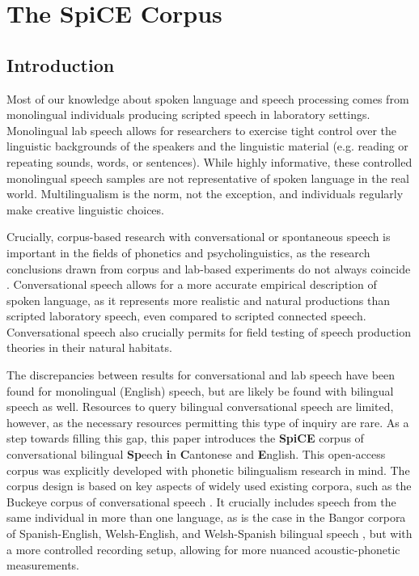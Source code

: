 
\chapter{The SpiCE Corpus}
\label{ch:Corpus}

\section{Introduction}\label{ch2:sec:introduction}
Most of our knowledge about spoken language and speech processing comes from monolingual individuals producing scripted speech in laboratory settings. Monolingual lab speech allows for researchers to exercise tight control over the linguistic backgrounds of the speakers and the linguistic material (e.g. reading or repeating sounds, words, or sentences). While highly informative, these controlled monolingual speech samples are not representative of spoken language in the real world. Multilingualism is the norm, not the exception, and individuals regularly make creative linguistic choices. 

Crucially, corpus-based research with conversational or spontaneous speech is important in the fields of phonetics and psycholinguistics, as the research conclusions drawn from corpus and lab-based experiments do not always coincide \citep{gahl_2012_reduce}. Conversational speech allows for a more accurate empirical description of spoken language, as it represents more realistic and natural productions than scripted laboratory speech, even compared to scripted connected speech. Conversational speech also crucially permits for field testing of speech production theories \citep{bell_2009_predictability, gahl_2012_reduce} in their natural habitats. 

The discrepancies between results for conversational and lab speech have been found for monolingual (English) speech, but are likely be found with bilingual speech as well. Resources to query bilingual conversational speech are limited, however, as the necessary resources permitting this type of inquiry are rare. As a step towards filling this gap, this paper introduces the \textbf{SpiCE} corpus of conversational bilingual \textbf{Sp}eech \textbf{i}n \textbf{C}antonese and \textbf{E}nglish. This open-access corpus was explicitly developed with phonetic bilingualism research in mind. The corpus design is based on key aspects of widely used existing corpora, such as the Buckeye corpus of conversational speech \citep{pitt_2005_buckeye}. It crucially includes speech from the same individual in more than one language, as is the case in the Bangor corpora of Spanish-English, Welsh-English, and Welsh-Spanish bilingual speech \citep{deuchar_2014_corpora}, but with a more controlled recording setup, allowing for more nuanced acoustic-phonetic measurements. 

